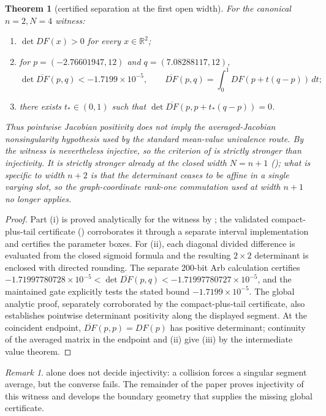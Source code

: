 \documentclass[11pt,twoside,leqno]{article}
\theoremstyle{plain}
\newtheorem{theorem}{Theorem}[section]
\theoremstyle{definition}
\theoremstyle{remark}
\newtheorem{remark}[remark]{Remark}
\newcommand{\R}{\mathbb{R}}
\begin{document}
\begin{theorem}[certified separation at the first open width]
\label{thm:separation}
For the canonical $n=2,N=4$ witness:
\begin{enumerate}[label=(\roman*),leftmargin=*]
\item $\det DF(x)>0$ for every $x\in\R^2$;
\item for $p=(-2.76601947,12)$ and $q=(7.08288117,12)$,
\[
 \det\overline{DF}(p,q)<-1.7199\times10^{-5},
 \qquad
 \overline{DF}(p,q)=\int_0^1DF(p+t(q-p))\,dt;
\]
\item there exists $t_*\in(0,1)$ such that $\det\overline{DF}(p,p+t_*(q-p))=0$.
\end{enumerate}
Thus pointwise Jacobian positivity does not imply the averaged-Jacobian nonsingularity hypothesis used by the standard mean-value univalence route.  By  the witness is nevertheless injective, so the criterion of  is strictly stronger than injectivity.  It is strictly stronger already at the closed width $N=n+1$ (); what is specific to width $n+2$ is that the determinant ceases to be affine in a single varying slot, so the graph-coordinate rank-one commutation used at width $n+1$ no longer applies.
\end{theorem}

\begin{proof}
Part (i) is proved analytically for the witness by ; the validated compact-plus-tail certificate () corroborates it through a separate interval implementation and certifies the parameter boxes. For (ii), each diagonal divided difference is evaluated from the closed sigmoid formula and the resulting $2\times2$ determinant is enclosed with directed rounding. The separate 200-bit Arb calculation certifies
$-1.71997780728\times10^{-5}<\det\overline{DF}(p,q)<-1.71997780727\times10^{-5}$,
and the maintained gate explicitly tests the stated bound $-1.7199\times10^{-5}$. The global analytic proof, separately corroborated by the compact-plus-tail certificate, also establishes pointwise determinant positivity along the displayed segment. At the coincident endpoint, $\overline{DF}(p,p)=DF(p)$ has positive determinant; continuity of the averaged matrix in the endpoint and (ii) give (iii) by the intermediate value theorem.
\end{proof}

\begin{remark}
 alone does not decide injectivity: a collision forces a singular segment average, but the converse fails. The remainder of the paper proves injectivity of this witness and develops the boundary geometry that supplies the missing global certificate.
\end{remark}
\end{document}
